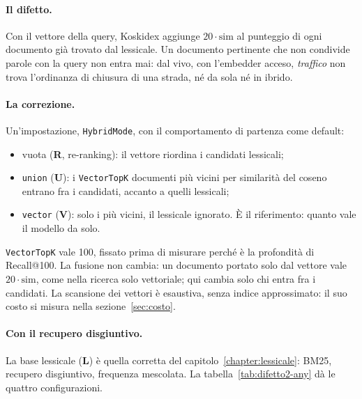 \paragraph{Il difetto.} Con il vettore della query, Koskidex aggiunge
$20 \cdot \text{sim}$ al punteggio di ogni documento già trovato dal lessicale. Un
documento pertinente che non condivide parole con la query non entra mai: dal vivo,
con l'embedder acceso, \emph{traffico} non trova l'ordinanza di chiusura di una
strada, né da sola né in ibrido.

\paragraph{La correzione.} Un'impostazione, \texttt{HybridMode}, con il
comportamento di partenza come default:
\begin{itemize}
  \item vuota (\textbf{R}, re-ranking): il vettore riordina i candidati lessicali;
  \item \texttt{union} (\textbf{U}): i \texttt{VectorTopK} documenti più vicini per
        similarità del coseno entrano fra i candidati, accanto a quelli lessicali;
  \item \texttt{vector} (\textbf{V}): solo i più vicini, il lessicale ignorato. È il
        riferimento: quanto vale il modello da solo.
\end{itemize}
\texttt{VectorTopK} vale 100, fissato prima di misurare perché è la profondità di
Recall@100. La fusione non cambia: un documento portato solo dal vettore vale
$20 \cdot \text{sim}$, come nella ricerca solo vettoriale; qui cambia solo chi
entra fra i candidati. La scansione dei vettori è esaustiva, senza indice
approssimato: il suo costo si misura nella sezione~\ref{sec:costo}.

\paragraph{Con il recupero disgiuntivo.} La base lessicale (\textbf{L}) è quella
corretta del capitolo~\ref{chapter:lessicale}: BM25, recupero disgiuntivo,
frequenza mescolata. La tabella~\ref{tab:difetto2-any} dà le quattro configurazioni.

